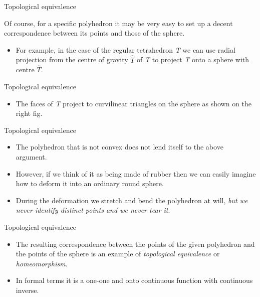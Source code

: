 \documentclass{beamer}
\begin{document}
\begin{frame}{Topological equivalence}
  \begin{block}{}
    Of course, for a specific polyhedron it may be very easy to set up a decent correspondence between its points and those of the sphere.
    \begin{itemize}
    \item For example, in the case of the regular tetrahedron \textsl{T} we can use radial projection from the centre of gravity $\hat T$ of \textsl{T} to project \textsl{T} onto a sphere with centre $\hat T$.
    \end{itemize}
  \end{block}
\end{frame}

\begin{frame}{Topological equivalence}
  \begin{block}{}
    \begin{itemize}
    \item The faces of \textsl{T} project to curvilinear triangles on the sphere as shown on the right fig.
    \end{itemize}
  \end{block}
\end{frame}

\begin{frame}{Topological equivalence}
  \begin{block}{}
    \begin{itemize}
    \item The polyhedron that is not convex does not lend itself to the above argument.
    \item However, if we think of it as being made of rubber then we can easily imagine how to deform it into an ordinary round sphere.
    \item During the deformation we stretch and bend the polyhedron at will, \textsl{but we never identify distinct points and we never tear it}.
    \end{itemize}
  \end{block}
\end{frame}

\begin{frame}{Topological equivalence}
  \begin{block}{}
    \begin{itemize}
    \item The resulting correspondence between the points of the given polyhedron and the points of the sphere is an example of \textsl{topological equivalence} or \textsl{homeomorphism}.
    \item In formal terms it is a one-one and onto continuous function with continuous inverse.
    \end{itemize}
  \end{block}
\end{frame}
\end{document}
